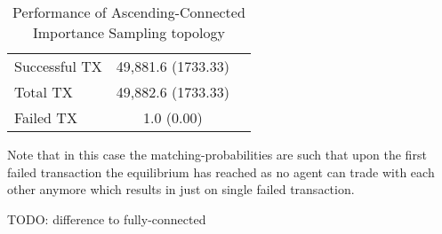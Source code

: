 \documentclass[Bachelorarbeit.tex]{subfiles}
\begin{document}
\begin{table}[h]
	\caption{Performance of Ascending-Connected Importance Sampling topology}
	\centering
	\begin{tabular} { l c r }
		\hline
		Successful TX & 49,881.6 (1733.33) \\
		Total TX & 49,882.6 (1733.33) \\
		Failed TX & 1.0 (0.00) \\
		\hline
	\end{tabular}
\end{table}

Note that in this case the matching-probabilities are such that upon the first failed transaction the equilibrium has reached as no agent can trade with each other anymore which results in just on single failed transaction.

TODO: difference to fully-connected 
\end{document}
